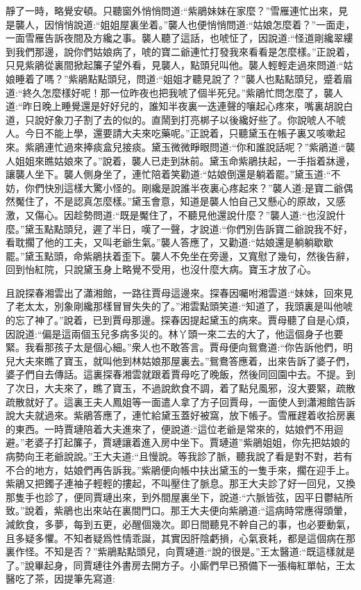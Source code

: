 \begin{parag}
    靜了一時，略覺安頓。只聽窗外悄悄問道:“紫鵑妹妹在家麼？”雪雁連忙出來，見是襲人，因悄悄說道:“姐姐屋裏坐着。”襲人也便悄悄問道:“姑娘怎麼着？”一面走，一面雪雁告訴夜間及方纔之事。襲人聽了這話，也唬怔了，因說道:“怪道剛纔翠縷到我們那邊，說你們姑娘病了，唬的寶二爺連忙打發我來看看是怎麼樣。”正說着，只見紫鵑從裏間掀起簾子望外看，見襲人，點頭兒叫他。襲人輕輕走過來問道:“姑娘睡着了嗎？”紫鵑點點頭兒，問道:“姐姐才聽見說了？”襲人也點點頭兒，蹙着眉道:“終久怎麼樣好呢！那一位昨夜也把我唬了個半死兒。”紫鵑忙問怎麼了，襲人道:“昨日晚上睡覺還是好好兒的，誰知半夜裏一迭連聲的嚷起心疼來，嘴裏胡說白道，只說好象刀子割了去的似的。直鬧到打亮梆子以後纔好些了。你說唬人不唬人。今日不能上學，還要請大夫來吃藥呢。”正說着，只聽黛玉在帳子裏又咳嗽起來。紫鵑連忙過來捧痰盒兒接痰。黛玉微微睜眼問道:“你和誰說話呢？”紫鵑道:“襲人姐姐來瞧姑娘來了。”說着，襲人已走到牀前。黛玉命紫鵑扶起，一手指着牀邊，讓襲人坐下。襲人側身坐了，連忙陪着笑勸道:“姑娘倒還是躺着罷。”黛玉道:“不妨，你們快別這樣大驚小怪的。剛纔是說誰半夜裏心疼起來？”襲人道:是寶二爺偶然魘住了，不是認真怎麼樣。”黛玉會意，知道是襲人怕自己又懸心的原故，又感激，又傷心。因趁勢問道:“既是魘住了，不聽見他還說什麼？”襲人道:“也沒說什麼。”黛玉點點頭兒，遲了半日，嘆了一聲，才說道:“你們別告訴寶二爺說我不好，看耽擱了他的工夫，又叫老爺生氣。”襲人答應了，又勸道:“姑娘還是躺躺歇歇罷。”黛玉點頭，命紫鵑扶着歪下。襲人不免坐在旁邊，又寬慰了幾句，然後告辭，回到怡紅院，只說黛玉身上略覺不受用，也沒什麼大病。寶玉才放了心。
\end{parag}


\begin{parag}
    且說探春湘雲出了瀟湘館，一路往賈母這邊來。探春因囑咐湘雲道:“妹妹，回來見了老太太，別象剛纔那樣冒冒失失的了。”湘雲點頭笑道:“知道了，我頭裏是叫他唬的忘了神了。”說着，已到賈母那邊。探春因提起黛玉的病來。賈母聽了自是心煩，因說道:“偏是這兩個玉兒多病多災的。林丫頭一來二去的大了，他這個身子也要緊。我看那孩子太是個心細。”衆人也不敢答言。賈母便向鴛鴦道:“你告訴他們，明兒大夫來瞧了寶玉，就叫他到林姑娘那屋裏去。”鴛鴦答應着，出來告訴了婆子們，婆子們自去傳話。這裏探春湘雲就跟着賈母吃了晚飯，然後同回園中去。不提。到了次日，大夫來了，瞧了寶玉，不過說飲食不調，着了點兒風邪，沒大要緊，疏散疏散就好了。這裏王夫人鳳姐等一面遣人拿了方子回賈母，一面使人到瀟湘館告訴說大夫就過來。紫鵑答應了，連忙給黛玉蓋好被窩，放下帳子。雪雁趕着收拾房裏的東西。一時賈璉陪着大夫進來了，便說道:“這位老爺是常來的，姑娘們不用迴避。”老婆子打起簾子，賈璉讓着進入房中坐下。賈璉道”紫鵑姐姐，你先把姑娘的病勢向王老爺說說。”王大夫道:“且慢說。等我診了脈，聽我說了看是對不對，若有不合的地方，姑娘們再告訴我。”紫鵑便向帳中扶出黛玉的一隻手來，擱在迎手上。紫鵑又把鐲子連袖子輕輕的摟起，不叫壓住了脈息。那王大夫診了好一回兒，又換那隻手也診了，便同賈璉出來，到外間屋裏坐下，說道:“六脈皆弦，因平日鬱結所致。”說着，紫鵑也出來站在裏間門口。那王大夫便向紫鵑道:“這病時常應得頭暈，減飲食，多夢，每到五更，必醒個幾次。即日間聽見不幹自己的事，也必要動氣，且多疑多懼。不知者疑爲性情乖誕，其實因肝陰虧損，心氣衰耗，都是這個病在那裏作怪。不知是否？”紫鵑點點頭兒，向賈璉道:“說的很是。”王太醫道:“既這樣就是了。”說畢起身，同賈璉往外書房去開方子。小廝們早已預備下一張梅紅單帖，王太醫吃了茶，因提筆先寫道:
\end{parag}


